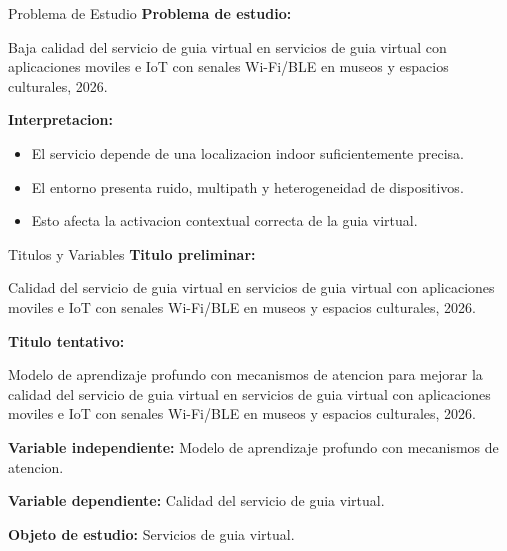 \documentclass[aspectratio=169,11pt]{beamer}
\begin{document}
\begin{frame}{Problema de Estudio}
\justifying
\textbf{Problema de estudio:}

\vspace{0.5em}

\colorbox{yellow!25}{\parbox{0.94\linewidth}{Baja calidad del servicio de guia virtual en servicios de guia virtual con aplicaciones moviles e IoT con senales Wi-Fi/BLE en museos y espacios culturales, 2026.}}

\vspace{0.9em}

\textbf{Interpretacion:}
\begin{itemize}
  \item El servicio depende de una localizacion indoor suficientemente precisa.
  \item El entorno presenta ruido, multipath y heterogeneidad de dispositivos.
  \item Esto afecta la activacion contextual correcta de la guia virtual.
\end{itemize}
\end{frame}

\begin{frame}{Titulos y Variables}
\justifying
\textbf{Titulo preliminar:}

\vspace{0.4em}

Calidad del servicio de guia virtual en servicios de guia virtual con aplicaciones moviles e IoT con senales Wi-Fi/BLE en museos y espacios culturales, 2026.

\vspace{0.7em}

\textbf{Titulo tentativo:}

\vspace{0.4em}

Modelo de aprendizaje profundo con mecanismos de atencion para mejorar la calidad del servicio de guia virtual en servicios de guia virtual con aplicaciones moviles e IoT con senales Wi-Fi/BLE en museos y espacios culturales, 2026.

\vspace{0.7em}

\textbf{Variable independiente:} Modelo de aprendizaje profundo con mecanismos de atencion.

\textbf{Variable dependiente:} Calidad del servicio de guia virtual.

\textbf{Objeto de estudio:} Servicios de guia virtual.
\end{frame}
\end{document}
